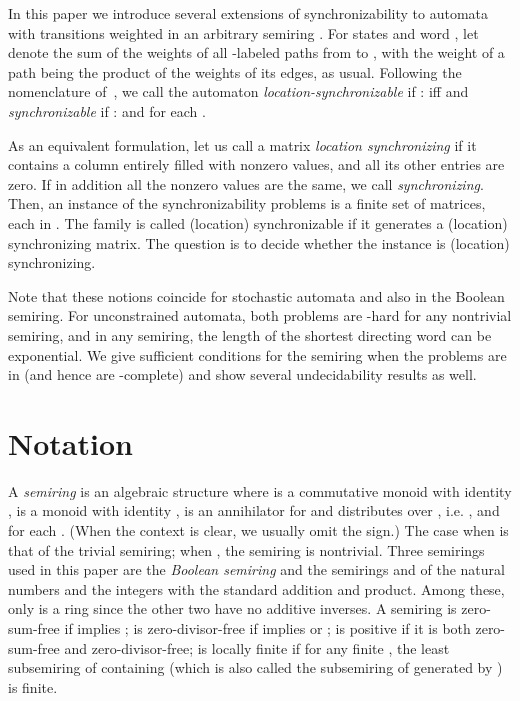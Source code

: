 \documentclass[submission,copyright,creativecommons]{eptcs}
\theoremstyle{plain}
\theoremstyle{definition}
\theoremstyle{remark}
\begin{document}
In this paper we introduce several extensions of synchronizability to automata with transitions weighted in an arbitrary semiring . For states  and word , let  denote the sum of the weights of all -labeled paths from  to , with the weight of a path being the product of the weights of its edges, as usual.
Following the nomenclature of~\cite{larsen},
we call the automaton  \emph{location-synchronizable} if : \quad iff  and \emph{synchronizable} if : \quad  and  for each .

As an equivalent formulation, let us call a matrix  \emph{location synchronizing} if it contains a column entirely filled with nonzero values, and all its other entries are zero.
If in addition all the nonzero values are the same, we call  \emph{synchronizing}.
Then, an instance of the synchronizability problems is a finite set  of matrices, each in . 
The family  is called (location) synchronizable if it generates a (location) synchronizing matrix.
The question is to decide whether the instance is (location) synchronizing.

Note that these notions coincide for stochastic automata and also in the Boolean semiring.
For unconstrained automata, both problems are -hard for any nontrivial semiring, and in any semiring,
the length of the shortest directing word can be exponential.
We give sufficient conditions for the semiring  when the problems are in  (and hence are -complete)
and show several undecidability results as well.

\section{Notation}

A \emph{semiring} is an algebraic structure  where  is a commutative monoid with identity ,
 is a monoid with identity ,  is an annihilator for  and  distributes over , i.e.
,  and  for each . (When the context is clear, we usually omit the  sign.)
The case when  is that of the trivial semiring; when , the semiring is nontrivial.
Three semirings used in this paper are
the \emph{Boolean semiring} 
and the semirings  and  of the natural numbers  and the integers 
with the standard addition and product. Among these, only  is a ring since the other two have no additive inverses.
A semiring  is zero-sum-free if  implies ; is zero-divisor-free if  implies  or ;
is positive if it is both zero-sum-free and zero-divisor-free;
is locally finite if for any finite , the least subsemiring of  containing  (which is also called
the subsemiring of  generated by ) is finite.
\end{document}
